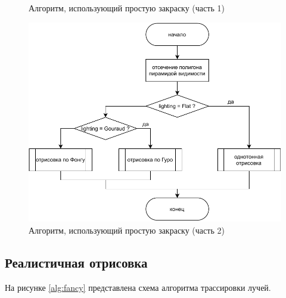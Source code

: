 \begin{figure}[h]
	\caption{Алгоритм, использующий простую закраску (часть 1)}
	\label{alg:fast:1}
\end{figure}

\begin{figure}
	\centering
	\includegraphics[width=\linewidth,height=0.85\textheight,keepaspectratio]{diagrams/draw-face.pdf}
	\caption{Алгоритм, использующий простую закраску (часть 2)}
	\label{alg:fast:2}
\end{figure}

\clearpage

\subsection{Реалистичная отрисовка}

На рисунке \ref{alg:fancy} представлена схема алгоритма трассировки лучей.

